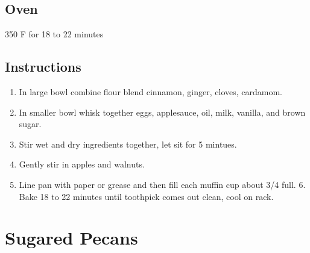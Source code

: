 \documentclass[letterpaper,10pt,english]{sphinxmanual}
\begin{document}

%
\begin{sphinxVerbatim}[commandchars=\\\{\}]
   
    
   
   
   
  
\end{sphinxVerbatim}


\section{Oven}
\label{\detokenize{Double_ASM:oven}}
350 F for 18 to 22 minutes


\section{Instructions}
\label{\detokenize{Double_ASM:instructions}}\begin{enumerate}
\item {} 
In large bowl combine flour blend cinnamon, ginger, cloves, cardamom.

\item {} 
In smaller bowl whisk together eggs, applesauce, oil, milk, vanilla, and brown sugar.

\item {} 
Stir wet and dry ingredients together, let sit for 5 mintues.

\item {} 
Gently stir in apples and walnuts.

\item {} 
Line pan with paper or grease and then fill each muffin cup about 3/4 full. 6. Bake 18 to 22 minutes until toothpick comes out clean, cool on rack.

\end{enumerate}


\chapter{Sugared Pecans}
\label{\detokenize{Candied_Pecans:sugared-pecans}}\label{\detokenize{Candied_Pecans::doc}}
\end{document}
